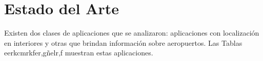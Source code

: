 
\chapter{Estado del Arte} %

\label{EstadoDelArte} %



Existen dos clases de aplicaciones que se analizaron: aplicaciones con localización en interiores y otras que brindan información sobre aeropuertos. Las Tablas eerkcmrkfer,gñelr,f muestran estas aplicaciones.

\begin{table}[h] 
	\begin{tabular}

	\end{tabular}
	\caption[Aplicaciones con Información de Viajes]{Aplicaciones con Información de Viajes} 
\end{table}

